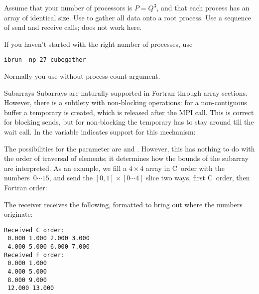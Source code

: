 \begin{exercise}
  \label{ex:cubegather}
  Assume that your number of processors is $P=Q^3$, and that each
  process has an array of identical size. Use
   to gather all data onto a root process.
  Use a sequence of send and receive calls;
   does not work here.


\begin{tacc}
If you haven't started  with the right number of processes,
use
\begin{verbatim}
ibrun -np 27 cubegather
\end{verbatim}
Normally you use  without process count argument.
\end{tacc}

\end{exercise}

\begin{fortrannote}{Subarrays}
  Subarrays are naturally supported in Fortran through array sections.
  However, there is a subtlety with non-blocking operations:
  for a non-contiguous buffer a temporary is created, which is released
  after the MPI call. This is correct for blocking sends, but for non-blocking
  the temporary has to stay around till the wait call.
  In  the variable 
  indicates support for this mechanism:
\end{fortrannote}

The possibilities for the  parameter are
 and .
However, this has nothing to do with the order of traversal of elements;
it determines how the bounds of the subarray are interpreted.
As an example, we fill a $4\times 4$ array in C~order with the numbers~$0\cdots15$,
and send the $[0,1]\times [0\cdots4]$ slice two ways, 
first C~order, then Fortran order:
%

The receiver receives the following, formatted to bring out
where the numbers originate:
\begin{verbatim}
Received C order:
 0.000 1.000 2.000 3.000
 4.000 5.000 6.000 7.000
Received F order:
 0.000 1.000
 4.000 5.000
 8.000 9.000
 12.000 13.000
\end{verbatim}

